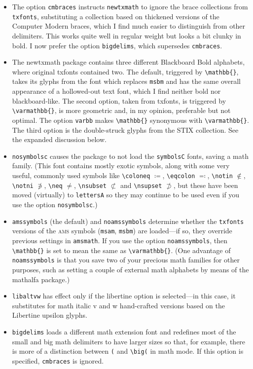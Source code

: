 \documentclass[11pt]{article}
\theoremstyle{oldplain}
\theoremstyle{plain}
\begin{document}
\begin{itemize}
\item The option {\tt cmbraces} instructs {\tt newtxmath} to ignore the brace collections from {\tt txfonts}, substituting a collection based on thickened versions of the Computer Modern braces, which I find much easier to distinguish from other delimiters. This works quite well in regular weight but looks a bit clunky in bold. I now prefer the option {\tt bigdelims}, which supersedes {\tt cmbraces}.
\item The \textsf{newtxmath} package contains three different Blackboard Bold alphabets, where original \textsf{txfonts} contained two. The default, triggered by \verb|\mathbb{}|, takes its glyphs from the font which replaces {\tt msbm} and has the same overall appearance of a hollowed-out text font, which I find neither bold nor blackboard-like. The second option, taken from \textsf{txfonts}, is triggered by \verb|\varmathbb{}|, is more geometric and, in my opinion, preferable but not optimal. The option {\tt varbb} makes \verb|\mathbb{}| synonymous with \verb|\varmathbb{}|. The third option is the double-struck glyphs from the STIX collection. See the expanded discussion below.
\item {\tt nosymbolsc} causes the package to not load the {\tt symbolsC} fonts, saving  a math family. (This font contains mostly exotic symbols, along with some very useful, commonly used symbols like \verb|\coloneq| $\coloneq$, \verb|\eqcolon| $\eqcolon$, \verb|\notin| $\notin$, \verb|\notni| $\notni$, \verb|\neq| $\neq$, \verb|\nsubset| $\nsubset$ and \verb|\nsupset| $\nsupset$, but these have been moved (virtually) to {\tt lettersA} so they may continue to be used even if you use the option {\tt nosymbolsc}.)
\item {\tt amssymbols} (the default) and {\tt noamssymbols} determine whether the {\tt txfonts} versions of the \textsc{ams} symbols ({\tt msam}, {\tt msbm}) are loaded---if so, they override previous settings in {\tt amsmath}. If you use the option {\tt noamssymbols}, then \verb|\mathbb{}| is set to mean the same as \verb|\varmathbb{}|. (One advantage of {\tt noamssymbols} is that you save two of your precious math families for other purposes, such as setting a couple of external math alphabets by means of the \textsf{mathalfa} package.)
\item {\tt libaltvw} has effect only if the libertine option is selected---in this case, it substitutes for math italic v and w hand-crafted versions based on the Libertine upsilon glyphs.
\item{\tt bigdelims} loads a different math extension font and redefines most of the small and big math delimiters to have larger sizes so that, for example, there is more of a distinction between \verb|(| and \verb|\big(| in math mode. If this option is specified, {\tt cmbraces} is ignored.

\end{itemize}
\end{document}
